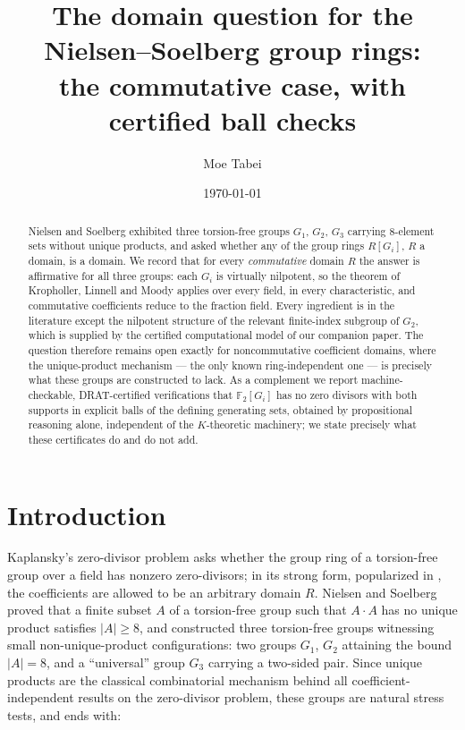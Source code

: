 \documentclass[11pt]{amsart}
\title[The Nielsen--Soelberg domain question]{The domain question for the
Nielsen--Soelberg group rings:\\ the commutative case, with certified ball
checks}
\author{Moe Tabei}
\date{\today}
\theoremstyle{definition}
\newcommand{\GOne}{G_1}
\newcommand{\GTwo}{G_2}
\newcommand{\GThree}{G_3}
\newcommand{\F}{\mathbb{F}}
\begin{document}
\begin{abstract}
Nielsen and Soelberg exhibited three torsion-free groups $\GOne$, $\GTwo$,
$\GThree$ carrying $8$-element sets without unique products, and asked
whether any of the group rings $R[G_i]$, $R$ a domain, is a domain. We
record that for every \emph{commutative} domain $R$ the answer is
affirmative for all three groups: each $G_i$ is virtually nilpotent, so the
theorem of Kropholler, Linnell and Moody applies over every field, in every
characteristic, and commutative coefficients reduce to the fraction field.
Every ingredient is in the literature except the nilpotent structure of the
relevant finite-index subgroup of $\GTwo$, which is supplied by the certified
computational model of our companion paper. The question therefore remains
open exactly for noncommutative coefficient domains, where the
unique-product mechanism --- the only known ring-independent one --- is
precisely what these groups are constructed to lack. As a complement we
report machine-checkable, DRAT-certified verifications that $\F_2[G_i]$ has
no zero divisors with both supports in explicit balls of the defining
generating sets, obtained by propositional reasoning alone, independent of
the $K$-theoretic machinery; we state precisely what these certificates do
and do not add.
\end{abstract}
\maketitle

\section{Introduction}\label{sec:intro}

Kaplansky's zero-divisor problem asks whether the group ring of a
torsion-free group over a field has nonzero zero-divisors; in its strong
form, popularized in \cite{NS}, the coefficients are allowed to be an
arbitrary domain $R$. Nielsen and Soelberg \cite{NS} proved that a finite
subset $A$ of a torsion-free group such that $A\cdot A$ has no unique
product satisfies $|A|\ge 8$, and constructed three torsion-free groups
witnessing small non-unique-product configurations: two groups $\GOne$,
$\GTwo$ attaining the bound $|A|=8$, and a ``universal'' group $\GThree$
carrying a two-sided pair. Since unique products are the classical
combinatorial mechanism behind all coefficient-independent results on the
zero-divisor problem, these groups are natural stress tests, and \cite{NS}
ends with:
\end{document}
